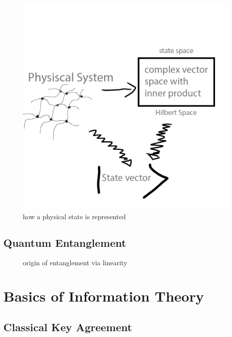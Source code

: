 	
	\begin{figure}[ht]
		\centering
		\includegraphics[scale=0.2]{images/sketch1.png} 
		\caption{how a physical state is represented}
	\end{figure}
	

	
		\subsection{Quantum Entanglement}
		\begin{figure}
		\centering
		
		\caption{origin of entanglement via linearity}
		\end{figure}
		
	\section{Basics of Information Theory}
		\subsection{Classical Key Agreement}
